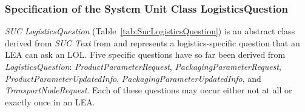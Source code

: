 \subsubsection{Specification of the System Unit Class LogisticsQuestion}

\emph{SUC LogisticsQuestion} (Table~\ref{tab:SucLogisticsQuestion}) is an abstract class derived from \emph{SUC Text} from \cite{PNO.2025.Part1} and represents a logistics-specific question that an LEA can ask an LOL. Five specific questions have so far been derived from \emph{LogisticsQuestion}: \emph{ProductParameterRequest}, \emph{PackagingParameterRequest}, \emph{ProductParameterUpdatedInfo}, \emph{PackagingParameterUpdatedInfo}, and \emph{TransportNodeRequest}. Each of these questions may occur either not at all or exactly once in an LEA.

